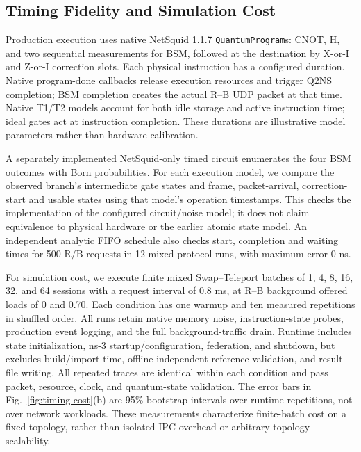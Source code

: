 \subsection{Timing Fidelity and Simulation Cost}
Production execution uses native NetSquid 1.1.7 \texttt{QuantumProgram}s:
CNOT, H, and two sequential measurements for BSM, followed at the destination
by X-or-I and Z-or-I correction slots. Each physical instruction has a configured
duration. Native program-done callbacks release execution resources and trigger
Q2NS completion; BSM completion creates the actual R--B UDP packet at that time.
Native T1/T2 models account for both idle storage and active instruction time;
ideal gates act at instruction completion. These durations are illustrative
model parameters rather than hardware calibration.

A separately implemented NetSquid-only timed circuit enumerates the four BSM
outcomes with Born probabilities. For each execution model, we compare the
observed branch's intermediate gate states and frame, packet-arrival,
correction-start and usable states using that model's operation timestamps.
This checks the implementation of the configured circuit/noise model; it does
not claim equivalence to physical hardware or the earlier atomic state model.
An independent analytic FIFO schedule also checks start, completion and waiting
times for 500 R/B requests in 12 mixed-protocol runs, with maximum error 0 ns.

For simulation cost, we execute finite mixed Swap--Teleport batches of
1, 4, 8, 16, 32, and 64 sessions with a request interval of 0.8 ms, at
R--B background offered loads of 0 and 0.70. Each condition has one warmup
and ten measured repetitions in shuffled order. All runs retain native memory
noise, instruction-state probes, production event logging, and the full background-traffic drain.
Runtime includes state initialization, ns-3 startup/configuration, federation,
and shutdown, but excludes build/import time, offline independent-reference
validation, and result-file writing. All repeated traces are identical within
each condition and pass packet, resource, clock, and quantum-state validation.
The error bars in Fig.~\ref{fig:timing-cost}(b) are 95\% bootstrap intervals
over runtime repetitions, not over network workloads. These measurements
characterize finite-batch cost on a fixed topology, rather than isolated IPC
overhead or arbitrary-topology scalability.

